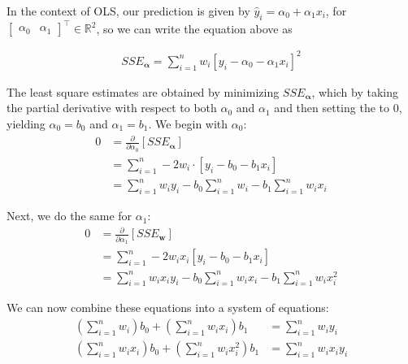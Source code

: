 \documentclass[12pt]{article}
\begin{document}
\begin{enumerate}
In the context of OLS, our prediction is given by $\hat{y}_i = \alpha_0 + \alpha_1x_i$,
for $\begin{bmatrix}
	\alpha_0 & \alpha_1
\end{bmatrix}^{\top}\in\mathbb{R}^2$, so we can write the equation above as

\begin{align*}
	SSE_{\mathbf{\alpha}} = \sum_{i=1}^{n}w_i[ y_i - \alpha_0-\alpha_1 x_i]^2
\end{align*}

The least square estimates are obtained by minimizing
$SSE_{\mathbf{\alpha}}$, which by taking the partial derivative with respect to both
$\alpha_0$ and $\alpha_1$ and then setting the to $0$, yielding $\alpha_0=b_0$
and $\alpha_1=b_1$. We begin with $\alpha_0$:
\begin{align*}
	0&=\frac{\partial}{\partial \alpha_0}[SSE_{\mathbf{\alpha}}]\\
	&=\sum_{i=1}^{n}-2w_i\cdot [y_i - b_0 - b_1x_i]\\
	&=\sum_{i=1}^{n}w_iy_i-b_0\sum_{i=1}^{n}w_i-b_1\sum_{i=1}^{n}w_ix_i
\end{align*}

Next, we do the same for $\alpha_1$:
\begin{align*}
	0 &= \frac{\partial}{\partial \alpha_1}[SSE_{\mathbf{w}}]\\
	&=\sum_{i=1}^{n}-2w_ix_i[y_i-b_0-b_1x_i]\\
	&=\sum_{i=1}^{n}w_ix_iy_i - b_0\sum_{i=1}^{n}w_ix_i  - b_1\sum_{i=1}^{n}w_ix_i^2
\end{align*}

We can now combine these equations into a system of equations:
\begin{align*}
	\left(\sum_{i=1}^{n}w_i\right)b_0 + \left(\sum_{i=1}^{n}w_ix_i\right)b_1 &=\sum_{i=1}^{n}w_iy_i\\
	\left(\sum_{i=1}^{n}w_ix_i\right)b_0 + \left(\sum_{i=1}^{n}w_ix_i^2\right)b_1 &=\sum_{i=1}^{n}w_ix_iy_i
 \end{align*}


\end{enumerate}
\end{document}
